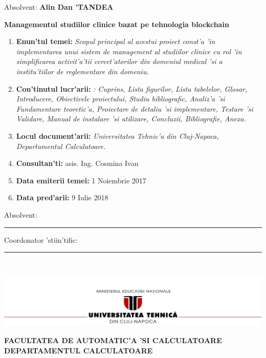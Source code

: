 \documentclass[12pt,a4paper,twoside]{report}
\renewcommand{\thesisauthor}{Alin Dan 'TANDEA}    %
\renewcommand{\thesistitle}{Managementul studiilor clinice bazat pe
tehnologia blockchain} %
\renewcommand{\thesissupervisor}{asis. Ing. Cosmina Ivan}
\newcommand{\department}{FACULTATEA DE AUTOMATIC'A 'SI CALCULATOARE\\
DEPARTAMENTUL CALCULATOARE}
\newcommand{\uline}[1]{\rule[0pt]{#1}{0.4pt}}
\newcommand{\utcnlogo}{\includegraphics[width=15cm]{img/utcn.jpg}}
\begin{document}
\vspace{2cm}

\begin{center}
Absolvent: {\bf \thesisauthor}

\vspace{1cm}

{\bf \thesistitle}
\end{center}

\vspace{1cm}

\begin{enumerate}
 \item {\bf Enun'tul temei:} {\it Scopul principal al acestui proiect const'a 'in implementarea unui sistem de management al studiilor clinice cu rol 'in simplificarea activit'a'tii cercet'atorilor din domeniul medical 'si a institu'tiilor de reglementare din domeniu.}
\item {\bf Con'tinutul lucr'arii:} {\it : Cuprins, Lista figurilor, Lista tabelelor, Glosar, Introducere, Obiectivele proiectului,
Studiu bibliografic, Analiz'a 'si Fundamentare teoretic'a, Proiectare de detaliu 'si
implementare, Testare 'si Validare, Manual de instalare 'si utilizare, Concluzii,
Bibliografie, Anexa.}
\item {\bf Locul document'arii:} {\it  Universitatea Tehnic'a din Cluj-Napoca, Departamentul Calculatoare.}
\item {\bf Consultan'ti:} \thesissupervisor
\item {\bf Data emiterii temei:} 1 Noiembrie 2017
\item {\bf Data pred'arii:} 9 Iulie 2018 
  \end{enumerate}
\vspace{1.2cm}

\hspace{6cm} Absolvent: \uline{6cm} 

\vspace{0.5cm}
\hspace{6cm} Coordonator 'stiin'tific: \uline{5cm} 

\thispagestyle{empty}


\newpage
$ $


\thispagestyle{empty}
\newpage

\begin{center}
\utcnlogo

{\bf \department}
\end{center}
\end{document}
